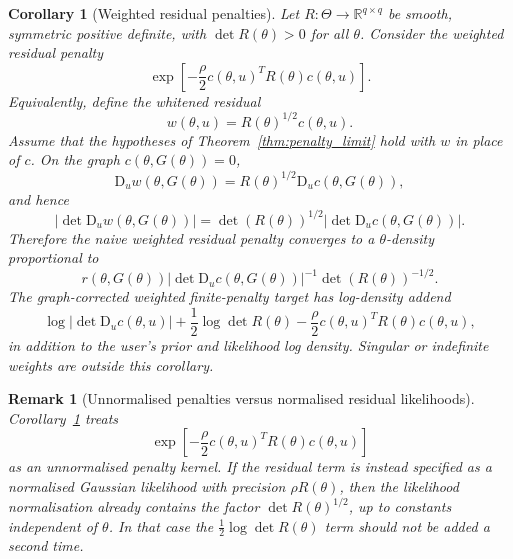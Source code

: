 \documentclass[11pt]{article}
\newtheorem{corollary}{Corollary}
\newtheorem{remark}{Remark}
\newcommand{\R}{\mathbb{R}}
\newcommand{\D}{\mathrm{D}}
\newcommand{\abs}[1]{\left\lvert #1\right\rvert}
\begin{document}
\begin{corollary}[Weighted residual penalties]
\label{cor:weighted_residuals}
Let \(R:\Theta\to\R^{q\times q}\) be smooth, symmetric positive definite, with \(\det R(\theta)>0\) for all \(\theta\). Consider the weighted residual penalty
\begin{equation}
 \exp\!\left[
  -\frac{\rho}{2}c(\theta,u)^T R(\theta)c(\theta,u)
 \right].
 \label{eq:weighted_residual_penalty}
\end{equation}
Equivalently, define the whitened residual
\begin{equation}
 w(\theta,u)=R(\theta)^{1/2}c(\theta,u).
 \label{eq:whitened_residual}
\end{equation}
Assume that the hypotheses of Theorem~\ref{thm:penalty_limit} hold with
\(w\) in place of \(c\). On the graph \(c(\theta,G(\theta))=0\),
\begin{equation}
 \D_u w(\theta,G(\theta))
 =
 R(\theta)^{1/2}\D_u c(\theta,G(\theta)),
 \label{eq:Du_weighted_residual}
\end{equation}
and hence
\begin{equation}
 \abs{\det \D_u w(\theta,G(\theta))}
 =
 \det(R(\theta))^{1/2}
 \abs{\det \D_u c(\theta,G(\theta))}.
 \label{eq:weighted_residual_det}
\end{equation}
Therefore the naive weighted residual penalty converges to a \(\theta\)-density
proportional to
\begin{equation}
 r(\theta,G(\theta))
 \abs{\det \D_u c(\theta,G(\theta))}^{-1}
 \det(R(\theta))^{-1/2}.
 \label{eq:weighted_naive_limit}
\end{equation}
The graph-corrected weighted finite-penalty target has log-density addend
\begin{equation}
 \log\abs{\det \D_u c(\theta,u)}
 +\frac{1}{2}\log\det R(\theta)
 -\frac{\rho}{2}c(\theta,u)^T R(\theta)c(\theta,u),
 \label{eq:weighted_corrected_addend}
\end{equation}
in addition to the user's prior and likelihood log density.
Singular or indefinite weights are outside this corollary.
\end{corollary}

\begin{remark}[Unnormalised penalties versus normalised residual likelihoods]
\label{rem:weighted_normalisation}
Corollary~\ref{cor:weighted_residuals} treats
\[ \exp\!\left[-\frac{\rho}{2}c(\theta,u)^TR(\theta)c(\theta,u)\right]\]
as an unnormalised penalty kernel. If the residual term is instead specified as a normalised Gaussian likelihood with precision \(\rho R(\theta)\), then the likelihood normalisation already contains the factor \(\det R(\theta)^{1/2}\), up to constants independent of \(\theta\). In that case the \(\frac12\log\det R(\theta)\) term should not be added a second time.
\end{remark}
\end{document}
